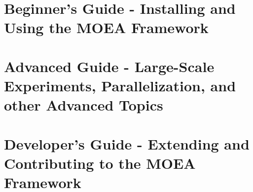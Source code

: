 \documentclass[12pt,twoside]{book}
\begin{document}
\sloppy %

\frontmatter




\tableofcontents

\mainmatter


\part{Beginner's Guide - Installing and Using the MOEA Framework}







\part{Advanced Guide - Large-Scale Experiments, Parallelization, and other Advanced Topics}





\part{Developer's Guide - Extending and Contributing to the MOEA Framework}




\backmatter




%
%
\end{document}
